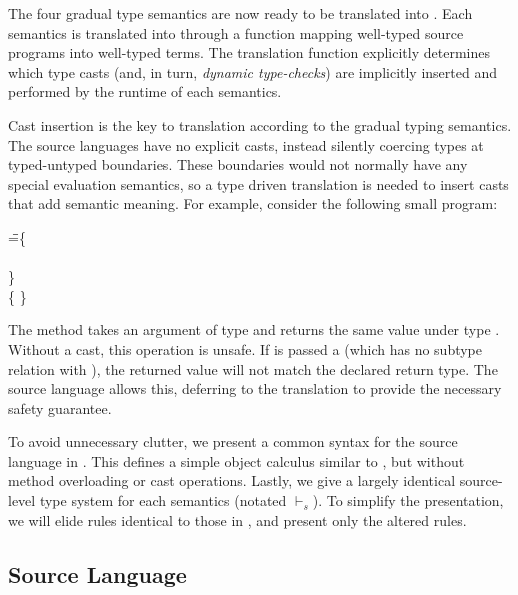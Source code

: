 \documentclass[a4paper,USenglish]{tex/lipics-v2016}
\begin{document}

\noindent The four gradual type semantics are now ready to be translated into
\kafka. Each semantics is translated into \kafka through a function mapping
well-typed source programs into well-typed \kafka terms. The translation
function explicitly determines which type casts (and, in turn, \emph{dynamic
type-checks}) are implicitly inserted and performed by the runtime of each
semantics.

Cast insertion is the key to translation according to the gradual typing
semantics. The source languages have no explicit casts, instead silently
coercing types at typed-untyped boundaries. These boundaries would not
normally have any special evaluation semantics, so a type driven translation
is needed to insert casts that add semantic meaning. For example, consider the
following small program:

\begin{tabbing}
\hspace{1cm}\K\HS \Call{\New\C{}}\m{\New\D{}} \HS\HS\HS\WHERE\HS
  \K\HS =\HS \= \class\= \C \{\\
       \> \HS \Mdef\m\x\any\C{\HS\x\HS}\\
       \> \}  \\
       \>\class \D \{ \}
\end{tabbing}         

\noindent The method \m takes an argument of type \any and returns the same
value under type \C. Without a cast, this operation is unsafe. If \m is passed
a \D (which has no subtype relation with \C), the returned value will not
match the declared return type. The source language allows this, deferring to
the translation to provide the necessary safety guarantee. 

To avoid unnecessary clutter, we present a common syntax for the source
language in . This defines a simple object calculus
similar to \kafka, but without method overloading or cast operations. Lastly,
we give a largely identical source-level type system for each semantics
(notated $\vdash_{\!s}$). To simplify the presentation, we will elide rules
identical to those in \kafka, and present only the altered rules.

\subsection{Source Language}
\end{document}
